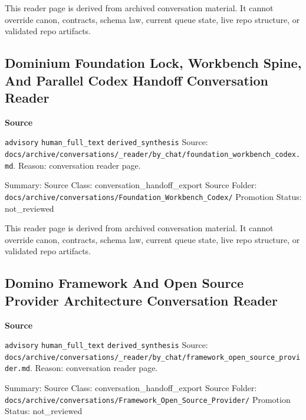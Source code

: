 \documentclass[9pt,a4paper,openany]{book}
\newcommand{\vonecallout}[3]{\par\medskip\noindent\begingroup\setlength{\fboxsep}{7pt}\colorbox{DomCalloutBg}{\parbox{0.94\linewidth}{\textbf{\textcolor{#1}{#2}}\par #3}}\endgroup\par\medskip}
\begin{document}
This reader page is derived from archived conversation material.\allowbreak{} It cannot override canon, contracts, schema law, current queue state, live repo structure, or validated repo artifacts.\allowbreak{}



\subsection{Dominium Foundation Lock, Workbench Spine, And Parallel Codex Handoff Conversation Reader}

\vonecallout{DomSlate}{Source}{\texttt{advisory} \texttt{human\_\allowbreak{}full\_\allowbreak{}text} \texttt{derived\_\allowbreak{}synthesis} Source: \texttt{docs/\allowbreak{}archive/\allowbreak{}conversations/\allowbreak{}\_\allowbreak{}reader/\allowbreak{}by\_\allowbreak{}chat/\allowbreak{}foundation\_\allowbreak{}workbench\_\allowbreak{}codex.\allowbreak{}md}.\allowbreak{} Reason: conversation reader page.\allowbreak{}}

Summary: Source Class: conversation\_\allowbreak{}handoff\_\allowbreak{}export Source Folder: \texttt{docs/\allowbreak{}archive/\allowbreak{}conversations/\allowbreak{}Foundation\_\allowbreak{}Workbench\_\allowbreak{}Codex/\allowbreak{}} Promotion Status: not\_\allowbreak{}reviewed


This reader page is derived from archived conversation material.\allowbreak{} It cannot override canon, contracts, schema law, current queue state, live repo structure, or validated repo artifacts.\allowbreak{}



\subsection{Domino Framework And Open Source Provider Architecture Conversation Reader}

\vonecallout{DomSlate}{Source}{\texttt{advisory} \texttt{human\_\allowbreak{}full\_\allowbreak{}text} \texttt{derived\_\allowbreak{}synthesis} Source: \texttt{docs/\allowbreak{}archive/\allowbreak{}conversations/\allowbreak{}\_\allowbreak{}reader/\allowbreak{}by\_\allowbreak{}chat/\allowbreak{}framework\_\allowbreak{}open\_\allowbreak{}source\_\allowbreak{}provider.\allowbreak{}md}.\allowbreak{} Reason: conversation reader page.\allowbreak{}}

Summary: Source Class: conversation\_\allowbreak{}handoff\_\allowbreak{}export Source Folder: \texttt{docs/\allowbreak{}archive/\allowbreak{}conversations/\allowbreak{}Framework\_\allowbreak{}Open\_\allowbreak{}Source\_\allowbreak{}Provider/\allowbreak{}} Promotion Status: not\_\allowbreak{}reviewed
\end{document}
